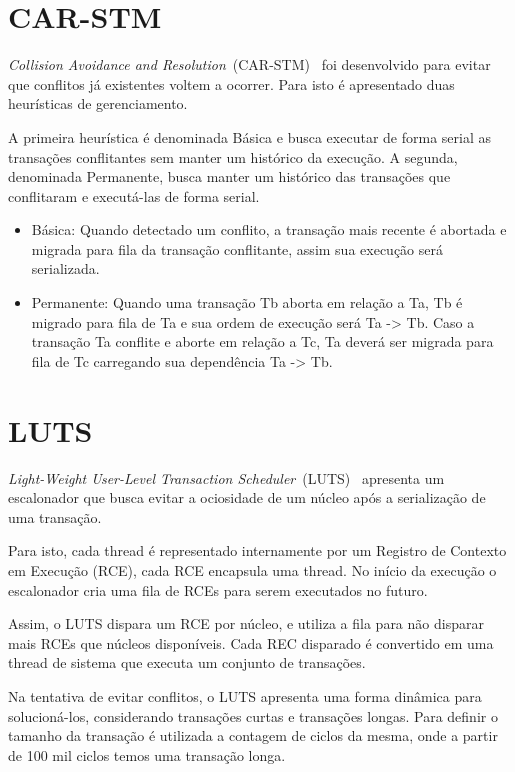 \documentclass[diss,capa]{texufpel}
\begin{document}
\section{CAR-STM}

\emph{Collision Avoidance and Resolution}~(CAR-STM)~\cite{carstm2008} foi desenvolvido para evitar que conflitos já existentes voltem a ocorrer. Para isto é apresentado duas heurísticas de gerenciamento.

A primeira heurística é denominada Básica e busca executar de forma serial as transações conflitantes sem manter um histórico da execução. A segunda, denominada Permanente, busca manter um histórico das transações que conflitaram e executá-las de forma serial.

\begin{itemize}
 \item Básica: Quando detectado um conflito, a transação mais recente é abortada e migrada para fila da transação conflitante, assim sua execução será serializada.
 \item Permanente: Quando uma transação Tb aborta em relação a Ta, Tb é migrado para fila de Ta e sua ordem de execução será Ta -> Tb. Caso a transação Ta conflite e aborte em relação a Tc, Ta deverá ser migrada para fila de Tc carregando sua dependência Ta -> Tb.
\end{itemize}

\section{LUTS}

\emph{Light-Weight User-Level Transaction Scheduler}~(LUTS)~\cite{Nicacio2012} apresenta um escalonador que busca evitar a ociosidade de um núcleo após a serialização de uma transação.

Para isto, cada thread é representado internamente por um Registro de Contexto em Execução (RCE), cada RCE encapsula uma thread. No início da execução o escalonador cria uma fila de RCEs para serem executados no futuro.

Assim, o LUTS dispara um RCE por núcleo, e utiliza a fila para não disparar mais RCEs que núcleos disponíveis. Cada REC disparado é convertido em uma thread de sistema que executa um conjunto de transações.

Na tentativa de evitar conflitos, o LUTS apresenta uma forma dinâmica para solucioná-los, considerando transações curtas e transações longas. Para definir o tamanho da transação é utilizada a contagem de ciclos da mesma, onde a partir de 100 mil ciclos temos uma transação longa.
\end{document}
